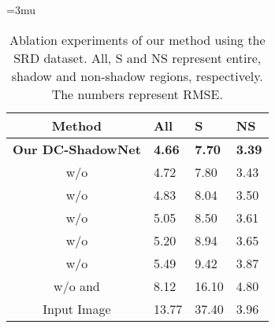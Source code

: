 \documentclass[10pt,twocolumn,letterpaper]{article}
\begin{document}
\begin{table}[t!]
	\small
	\centering
	\thickmuskip=3mu
	\renewcommand{\arraystretch}{1.2}
	\caption {Ablation experiments of our method using the SRD dataset. All, S and NS represent entire, shadow and non-shadow regions, respectively. The numbers represent RMSE.}	
	\label{tb:ablation}
	\begin{tabularx}{\columnwidth}{ c|Y|Y|Y }
		\toprule
		Method							&All &S &NS\\
\hline
		\bf Our DC-ShadowNet 			&\bf4.66 &\bf7.70  &\bf3.39\\	
		\hline
		w/o   &4.72 &7.80 &3.43\\
w/o  &4.83 &8.04  &3.50\\
w/o   &5.05 &8.50  &3.61\\
w/o        	        &5.20 &8.94  &3.65\\
w/o        	    &5.49 &9.42  &3.87\\
w/o  and    &8.12 &16.10  &4.80\\
		\hline
		Input Image                 	&13.77 &37.40 &3.96\\
		\bottomrule	
	\end{tabularx}
\end{table}
\end{document}
